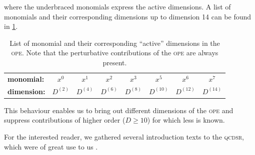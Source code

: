 \documentclass[../../index.tex]{subfiles}
\begin{document}
where the underbraced monomials express the active dimensions. A list of
monomials and their corresponding dimensions up to dimension 14 can be found in
\cref{table:monomialDimensions}.
\begin{table}
  \centering
  \begin{tabular}{l|ccccccc}
    \toprule
    \textbf{monomial:} & \(x^0\) & \(x^1\) & \(x^2\) & \(x^3\) & \(x^5\) & \(x^6\) & \(x^7\)\\
    \textbf{dimension:} & \(D^{(2)}\) & \(D^{(4)}\) & \(D^{(6)}\) & \(D^{(8)}\) & \(D^{(10)}\) & \(D^{(12)}\) & \(D^{(14)}\)\\
    \bottomrule 
  \end{tabular}
  \caption{List of monomial and their corresponding ``active'' dimensions in the
    \textsc{ope}. Note that the perturbative contributions of the \textsc{ope}
    are always present.}
  \label{table:monomialDimensions}
\end{table}
This behaviour enables us to bring out different dimensions of the \textsc{ope}
and suppress contributions of higher order (\(D\geq10\)) for which less is
known.


For the interested reader, we gathered several introduction texts to the
\textsc{qcdsr}, which were of great use to us
\cite{Narison1989,Rafael1997,Colangelo2000,Dominguez2013}.
\end{document}
